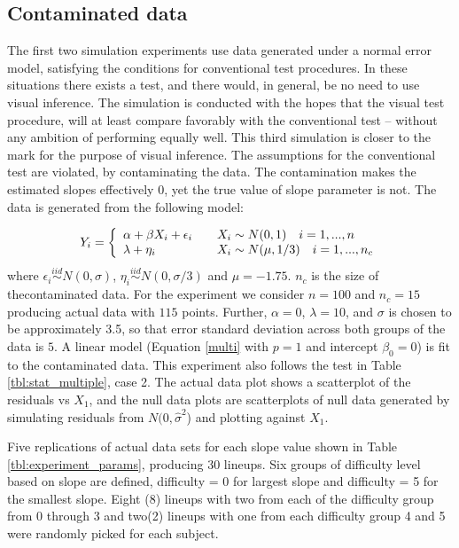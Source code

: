 \documentclass[12pt]{article}
\begin{document}
\subsection{Contaminated data}

The first two simulation experiments use data generated under a normal error model, satisfying the conditions for conventional test procedures. In these situations there exists a test, and there would, in general, be no need to use visual inference. The simulation is conducted with the hopes that the visual test procedure,  will at least compare favorably with the conventional test -- without any ambition of performing equally well.
 This third simulation is closer to the mark for the purpose of visual inference. The assumptions for the conventional test are violated, by contaminating the data. The contamination makes the estimated slopes effectively 0, yet the true value of slope parameter is not.  The data is generated from the following model:

\[
  Y_i = \left\{
  \begin{array}{l l}
    \alpha+\beta X_i + \epsilon_i  & \quad  X_i \sim N(0,1) \quad  i =1,...,n\\
    \lambda+ \eta_i & \quad X_i \sim N(\mu,1/3) \quad  i=1, ...,n_c\\
  \end{array} \right.
\]
where $\epsilon_i \stackrel{iid}\sim N(0,\sigma)$, $\eta_i \stackrel{iid}\sim N(0,\sigma/3)$ and $\mu = -1.75$. $n_c$ is the size of thecontaminated data. For the experiment we consider $n=100$ and $n_c=15$ producing actual data with $115$ points. Further, $\alpha=0$, $\lambda=10$, and $\sigma$ is chosen to be approximately 3.5, so that error standard deviation across both groups of the data is $5$. %
A linear model (Equation \ref{multi} with $p=1$  and intercept $\beta_0=0$) is fit to the contaminated data. This experiment also follows the test in Table \ref{tbl:stat_multiple}, case 2. The actual data plot shows a scatterplot of the residuals vs $X_1$, and the null data plots are scatterplots of null data generated by simulating residuals from $N(0, {\hat{\sigma}}^2$) and plotting against $X_1$. 

Five replications of actual data sets for each slope value shown in Table \ref{tbl:experiment_params}, producing 30 lineups. Six groups of difficulty level based on slope are defined, difficulty = 0 for largest slope and difficulty = 5 for the smallest slope.    Eight (8) lineups with two from each of the difficulty group from 0 through 3 and two(2) lineups with one from each difficulty group 4 and 5 were randomly picked for each subject. 
\end{document}
